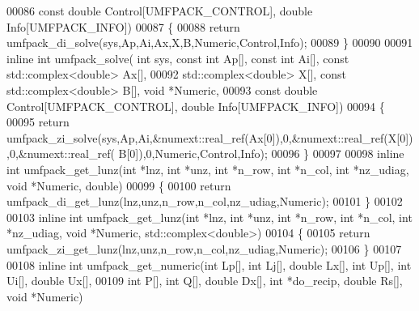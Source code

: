 \begin{DoxyCode}
00086                           \textcolor{keyword}{const} \textcolor{keywordtype}{double} Control[UMFPACK\_CONTROL], \textcolor{keywordtype}{double} Info[UMFPACK\_INFO])
00087 \{
00088   \textcolor{keywordflow}{return} umfpack\_di\_solve(sys,Ap,Ai,Ax,X,B,Numeric,Control,Info);
00089 \}
00090 
00091 \textcolor{keyword}{inline} \textcolor{keywordtype}{int} umfpack\_solve( \textcolor{keywordtype}{int} sys, \textcolor{keyword}{const} \textcolor{keywordtype}{int} Ap[], \textcolor{keyword}{const} \textcolor{keywordtype}{int} Ai[], \textcolor{keyword}{const} std::complex<double> Ax[],
00092                           std::complex<double> X[], \textcolor{keyword}{const} std::complex<double> B[], \textcolor{keywordtype}{void} *Numeric,
00093                           \textcolor{keyword}{const} \textcolor{keywordtype}{double} Control[UMFPACK\_CONTROL], \textcolor{keywordtype}{double} Info[UMFPACK\_INFO])
00094 \{
00095   \textcolor{keywordflow}{return} umfpack\_zi\_solve(sys,Ap,Ai,&numext::real\_ref(Ax[0]),0,&numext::real\_ref(X[0]),0,&numext::real\_ref(
      B[0]),0,Numeric,Control,Info);
00096 \}
00097 
00098 \textcolor{keyword}{inline} \textcolor{keywordtype}{int} umfpack\_get\_lunz(\textcolor{keywordtype}{int} *lnz, \textcolor{keywordtype}{int} *unz, \textcolor{keywordtype}{int} *n\_row, \textcolor{keywordtype}{int} *n\_col, \textcolor{keywordtype}{int} *nz\_udiag, \textcolor{keywordtype}{void} *Numeric, \textcolor{keywordtype}{
      double})
00099 \{
00100   \textcolor{keywordflow}{return} umfpack\_di\_get\_lunz(lnz,unz,n\_row,n\_col,nz\_udiag,Numeric);
00101 \}
00102 
00103 \textcolor{keyword}{inline} \textcolor{keywordtype}{int} umfpack\_get\_lunz(\textcolor{keywordtype}{int} *lnz, \textcolor{keywordtype}{int} *unz, \textcolor{keywordtype}{int} *n\_row, \textcolor{keywordtype}{int} *n\_col, \textcolor{keywordtype}{int} *nz\_udiag, \textcolor{keywordtype}{void} *Numeric, 
      std::complex<double>)
00104 \{
00105   \textcolor{keywordflow}{return} umfpack\_zi\_get\_lunz(lnz,unz,n\_row,n\_col,nz\_udiag,Numeric);
00106 \}
00107 
00108 \textcolor{keyword}{inline} \textcolor{keywordtype}{int} umfpack\_get\_numeric(\textcolor{keywordtype}{int} Lp[], \textcolor{keywordtype}{int} Lj[], \textcolor{keywordtype}{double} Lx[], \textcolor{keywordtype}{int} Up[], \textcolor{keywordtype}{int} Ui[], \textcolor{keywordtype}{double} Ux[],
00109                                \textcolor{keywordtype}{int} P[], \textcolor{keywordtype}{int} Q[], \textcolor{keywordtype}{double} Dx[], \textcolor{keywordtype}{int} *do\_recip, \textcolor{keywordtype}{double} Rs[], \textcolor{keywordtype}{void} *Numeric)

\end{DoxyCode}
